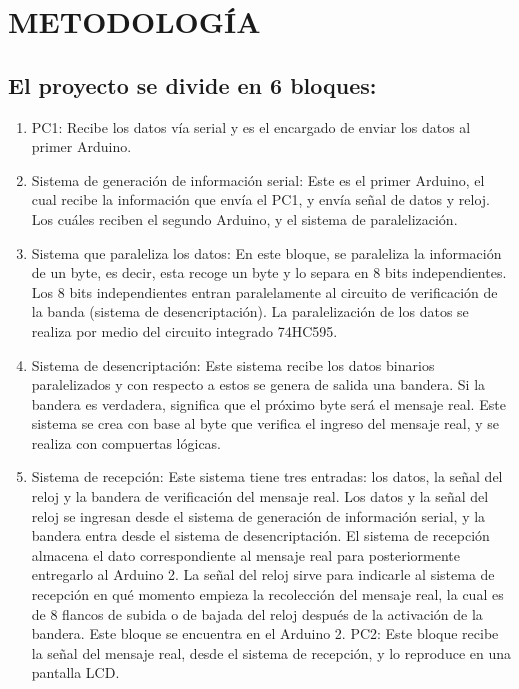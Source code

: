 \documentclass{article}
\begin{document}
\section{METODOLOGÍA}

\subsection{El proyecto se divide en 6 bloques:}

\begin{enumerate}
\item PC1: Recibe los datos vía serial y es el encargado de enviar los datos al primer Arduino.

\item Sistema de generación de información serial:  Este es el primer Arduino, el cual recibe la información que envía el PC1, y envía señal de datos y reloj. Los cuáles reciben el segundo Arduino, y el sistema de paralelización.

\item Sistema que paraleliza los datos:  En este bloque, se paraleliza la información de un byte, es decir, esta recoge un byte y lo separa en 8 bits independientes. Los 8 bits independientes entran paralelamente al circuito de verificación de la banda (sistema de desencriptación). La paralelización de los datos se realiza por medio del circuito integrado 74HC595.

\item Sistema de desencriptación: Este sistema recibe los datos binarios paralelizados y con respecto a estos se genera de salida una bandera. Si la bandera es verdadera, significa que el próximo byte será el mensaje real. Este sistema se crea con base al byte que verifica el ingreso del mensaje real, y se realiza con compuertas lógicas.

\item Sistema de recepción: Este sistema tiene tres entradas: los datos, la señal del reloj y la bandera de verificación del mensaje real. Los datos y la señal del reloj se ingresan desde el sistema de generación de información serial, y la bandera entra desde el sistema de desencriptación. El sistema de recepción almacena el dato correspondiente al mensaje real para posteriormente entregarlo al Arduino 2. La señal del reloj sirve para indicarle al sistema de recepción en qué momento empieza la recolección del mensaje real, la cual es de 8 flancos de subida o de bajada del reloj después de la activación de la bandera. Este bloque se encuentra en el Arduino 2.
PC2: Este bloque recibe la señal del mensaje real, desde el sistema de recepción, y lo reproduce en una pantalla LCD.

\end{enumerate}
\end{document}
